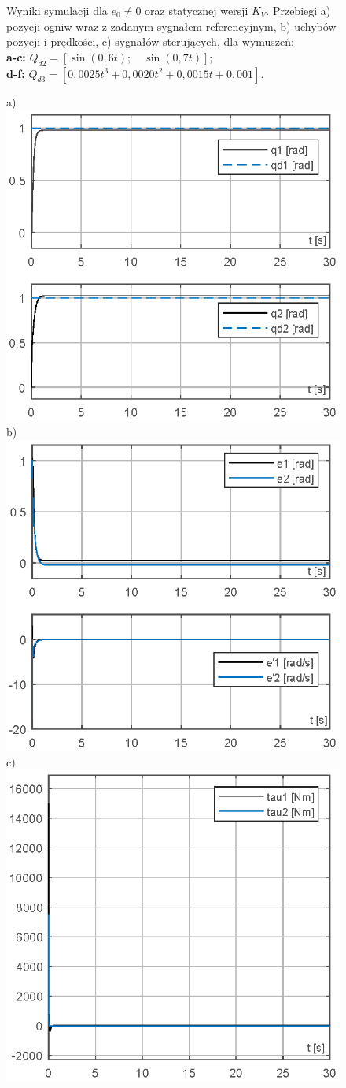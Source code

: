 \documentclass[10pt, a4paper, polish]{article}
\begin{document}
\begin{figure}[H]
{		Wyniki symulacji dla  $e_0\neq0$ oraz statycznej wersji $K_V$. Przebiegi a) pozycji ogniw wraz z zadanym sygnałem referencyjnym, b) uchybów pozycji i prędkości, c)  sygnałów sterujących, dla wymuszeń:\\
		\textbf{a-c:} $Q_{d2}=[\sin(0,6t);\quad \sin(0,7t)]$;\\
		\textbf{d-f:} $Q_{d3}=[0,0025t^3+0,0020t^2+0,0015t+0,001]$.}
\end{figure}
	\begin{figure}[H]\centering
	a) \includegraphics[width=0.30\columnwidth]{SRManCw5/SRManCw5_ZADANIE2/figs/04Pozycje} b)\includegraphics[width=0.30\columnwidth]{SRManCw5/SRManCw5_ZADANIE2/figs/04Uchyby} c)\includegraphics[width=0.30\columnwidth]{SRManCw5/SRManCw5_ZADANIE2/figs/04Sygnal}\\

\end{figure}
\end{document}
